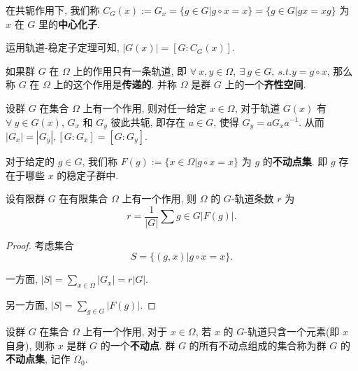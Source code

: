 \begin{definition}\label{中心化子}
	在共轭作用下, 我们称 $C_G(x):=G_x=\{g\in G|g\circ x=x\}=\{g\in G|gx=xg\}$ 为 $x$ 在 $G$ 里的\textbf{中心化子}.
\end{definition}

\begin{corollary}
	运用轨道-稳定子定理可知, $|G(x)|=[G:C_G(x)]$.
\end{corollary}

\begin{definition}\label{齐性空间}
	如果群 $G$ 在 $\Omega$ 上的作用只有一条轨道, 即 $\forall\ x,y\in\Omega,\ \exists\ g\in G,\ s.t. y=g\circ x$, 那么称 $G$ 在 $\Omega$ 上的这个作用是\textbf{传递的}. 并称 $\Omega$ 是群 $G$ 上的一个\textbf{齐性空间}.
\end{definition}

\begin{proposition}
	设群 $G$ 在集合 $\Omega$ 上有一个作用, 则对任一给定 $x\in \Omega$, 对于轨道 $G(x)$ 有 $\forall\ y\in G(x)$, $G_x$ 和 $G_y$ 彼此共轭, 即存在 $a\in G$, 使得 $G_y=aG_x a^{-1}$. 从而 $|G_x|=|G_y|,[G:G_x]=[G:G_y]$.
\end{proposition}

\begin{definition}\label{不动点集}
	对于给定的 $g\in G$, 我们称 $F(g):=\{x\in\Omega|g\circ x=x\}$ 为 $g$ 的\textbf{不动点集}. 即 $g$ 存在于哪些 $x$ 的稳定子群中.
\end{definition}

\begin{theorem}[\t{Burnside} 引理]\label{Burnside}
	设有限群 $G$ 在有限集合 $\Omega$ 上有一个作用, 则 $\Omega$ 的 $G$-轨道条数 $r$ 为 $$r=\frac{1}{|G|}\sum\limits{g\in G}|F(g)|.$$
\end{theorem}

\begin{proof}
	考虑集合 $$S=\{(g,x)|g\circ x=x\}.$$

	一方面, $|S|=\sum\limits_{x\in \Omega}|G_x|=r|G|$.


	另一方面, $|S|=\sum\limits_{g\in G}|F(g)|$.
\end{proof}

\begin{definition}\label{不动点}
	设群 $G$ 在集合 $\Omega$ 上有一个作用, 对于 $x\in\Omega$, 若 $x$ 的 $G$-轨道只含一个元素(即 $x$ 自身), 则称 $x$ 是群 $G$ 的一个\textbf{不动点}. 群 $G$ 的所有不动点组成的集合称为群 $G$ 的\textbf{不动点集}, 记作 $\Omega_0$.
\end{definition}

